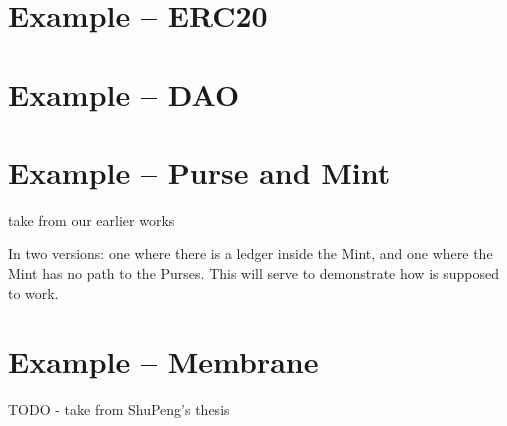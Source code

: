 \documentclass[acmsmall,screen]{acmart}
\begin{document}
\section{Example -- ERC20}


\section{Example -- DAO}


\section{Example -- Purse and Mint}
take from our earlier works

In two versions: one where there is a ledger inside the Mint, and one where the Mint has no path to the Purses. This will serve to demonstrate how  is supposed to work.

\section{Example -- Membrane}

TODO - take from ShuPeng's thesis

 \newpage
  
\onecolumn{
 
 }
\end{document}
